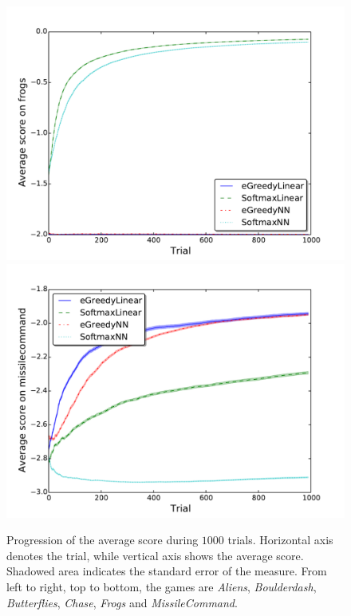 \documentclass[conference]{IEEEtran}
\begin{document}
\begin{figure}[!t]
\begin{center}
	\includegraphics[width = .45\textwidth]{img/frogs_scores}
	\includegraphics[width = .45\textwidth]{img/missilecommand_scores}\\

	\caption{Progression of the average score during $1000$ trials. Horizontal axis denotes the trial, while vertical axis shows the average score. Shadowed area indicates the standard error of the measure. From left to right, top to bottom, the games are \textit{Aliens}, \textit{Boulderdash}, \textit{Butterflies}, \textit{Chase}, \textit{Frogs} and \textit{MissileCommand}.}
	\label{fig:results1}
	\end{center}
\end{figure}
\end{document}
